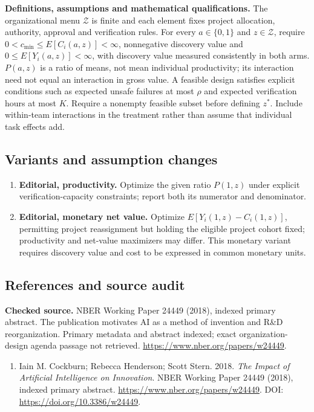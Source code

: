 \documentclass[11pt,a4paper]{article}
\begin{document}
\textbf{Definitions, assumptions and mathematical qualifications.} The organizational menu \(\mathcal Z\) is finite and each element fixes project allocation, authority, approval and verification rules. For every \(a\in\{0,1\}\) and \(z\in\mathcal Z\), require \(0<c_{\min}\leq E[C_i(a,z)]<\infty\), nonnegative discovery value and \(0\leq E[Y_i(a,z)]<\infty\), with discovery value measured consistently in both arms. \(P(a,z)\) is a ratio of means, not mean individual productivity; its interaction need not equal an interaction in gross value. A feasible design satisfies explicit conditions such as expected unsafe failures at most \(\rho\) and expected verification hours at most \(K\). Require a nonempty feasible subset before defining \(z^*\). Include within-team interactions in the treatment rather than assume that individual task effects add.
\subsection*{Variants and assumption changes}
\begin{enumerate}
\item \textbf{Editorial, productivity.} Optimize the given ratio \(P(1,z)\) under explicit verification-capacity constraints; report both its numerator and denominator.
\item \textbf{Editorial, monetary net value.} Optimize \(E[Y_i(1,z)-C_i(1,z)]\), permitting project reassignment but holding the eligible project cohort fixed; productivity and net-value maximizers may differ. This monetary variant requires discovery value and cost to be expressed in common monetary units.
\end{enumerate}
\subsection*{References and source audit}
\textbf{Checked source.} NBER Working Paper 24449 (2018), indexed primary abstract. The publication motivates AI as a method of invention and R\&D reorganization. Primary metadata and abstract indexed; exact organization-design agenda passage not retrieved. \url{https://www.nber.org/papers/w24449}.
\begin{enumerate}\raggedright
\item\hypertarget{definitions:source:30007696:1}{} Iain M. Cockburn; Rebecca Henderson; Scott Stern. 2018. \emph{The Impact of Artificial Intelligence on Innovation}. NBER Working Paper 24449 (2018), indexed primary abstract.
\url{https://www.nber.org/papers/w24449}.
DOI: \url{https://doi.org/10.3386/w24449}.
\end{enumerate}
\end{document}

